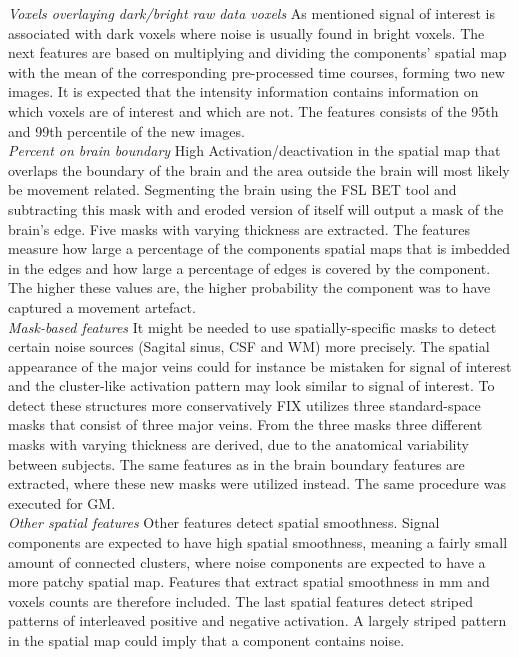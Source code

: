 \textit{Voxels overlaying dark/bright raw data voxels}
As mentioned signal of interest is associated with dark voxels where noise is usually found in bright voxels. The next features are based on multiplying and dividing the components’ spatial map with the mean of the corresponding pre-processed time courses, forming two new images. It is expected that the intensity information contains information on which voxels are of interest and which are not. The features consists of the 95th and 99th percentile of the new images. \\
\textit{Percent on brain boundary} High Activation/deactivation in the spatial map that overlaps the boundary of the brain and the area outside the brain will most likely be movement related. Segmenting the brain using the FSL BET tool and subtracting this mask with and eroded version of itself will output a mask of the brain’s edge. Five masks with varying thickness are extracted. The features measure how large a percentage of the components spatial maps that is imbedded in the edges and how large a percentage of edges is covered by the component. The higher these values are, the higher probability the component was to have captured a movement artefact. \\
\textit{Mask-based features} It might be needed to use spatially-specific masks to detect certain noise sources (Sagital sinus, CSF and WM) more precisely. The spatial appearance of the major veins could for instance be mistaken for signal of interest and the cluster-like activation pattern may look similar to signal of interest. To detect these structures more conservatively FIX utilizes three standard-space masks that consist of three major veins. From the three masks three different masks with varying thickness are derived, due to the anatomical variability between subjects. The same features as in the brain boundary features are extracted, where these new masks were utilized instead. The same procedure was executed for GM. \\
\textit{Other spatial features} Other features detect spatial smoothness. Signal components are expected to have high spatial smoothness, meaning a fairly small amount of connected clusters, where noise components are expected to have a more patchy spatial map. Features that extract spatial smoothness in mm and voxels counts are therefore included. The last spatial features detect striped patterns of interleaved positive and negative activation. A largely striped pattern in the spatial map could imply that a component contains noise. \cite{Salimi-Khorshidi2014}





